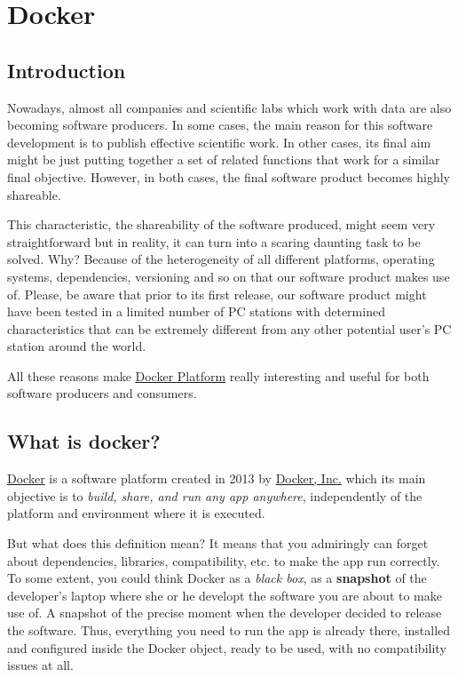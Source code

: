 \documentclass[]{book}
\begin{document}
\chapter{Docker}\label{docker}

\section{Introduction}\label{introduction}

Nowadays, almost all companies and scientific labs which work with data
are also becoming software producers. In some cases, the main reason for
this software development is to publish effective scientific work. In
other cases, its final aim might be just putting together a set of
related functions that work for a similar final objective. However, in
both cases, the final software product becomes highly shareable.

This characteristic, the shareability of the software produced, might
seem very straightforward but in reality, it can turn into a scaring
daunting task to be solved. Why? Because of the heterogeneity of all
different platforms, operating systems, dependencies, versioning and so
on that our software product makes use of. Please, be aware that prior
to its first release, our software product might have been tested in a
limited number of PC stations with determined characteristics that can
be extremely different from any other potential user's PC station around
the world.

All these reasons make \href{https://www.docker.com/}{Docker Platform}
really interesting and useful for both software producers and consumers.

\section{What is docker?}\label{what-is-docker}

\href{https://www.docker.com/}{Docker} is a software platform created in
2013 by \href{https://en.wikipedia.org/wiki/Docker,_Inc.}{Docker, Inc.}
which its main objective is to \emph{build, share, and run any app
anywhere}, independently of the platform and environment where it is
executed.

But what does this definition mean? It means that you admiringly can
forget about dependencies, libraries, compatibility, etc. to make the
app run correctly. To some extent, you could think Docker as a
\emph{black box}, as a \textbf{snapshot} of the developer's laptop where
she or he developt the software you are about to make use of. A snapshot
of the precise moment when the developer decided to release the
software. Thus, everything you need to run the app is already there,
installed and configured inside the Docker object, ready to be used,
with no compatibility issues at all.
\end{document}
